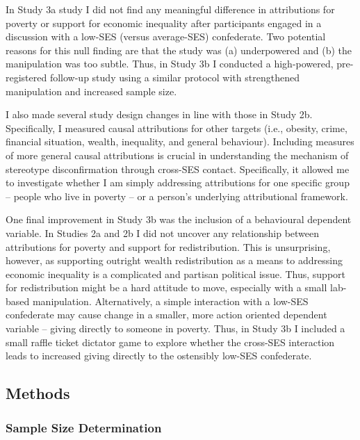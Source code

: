 \documentclass{sfuthesis}
\begin{document}
In Study 3a study I did not find any meaningful difference in attributions for poverty or support for economic inequality after participants engaged in a discussion with a low-SES (versus average-SES) confederate. Two potential reasons for this null finding are that the study was (a) underpowered and (b) the manipulation was too subtle. Thus, in Study 3b I conducted a high-powered, pre-registered follow-up study using a similar protocol with strengthened manipulation and increased sample size.

I also made several study design changes in line with those in Study 2b. Specifically, I measured causal attributions for other targets (i.e., obesity, crime, financial situation, wealth, inequality, and general behaviour). Including measures of more general causal attributions is crucial in understanding the mechanism of stereotype disconfirmation through cross-SES contact. Specifically, it allowed me to investigate whether I am simply addressing attributions for one specific group – people who live in poverty – or a person’s underlying attributional framework.

One final improvement in Study 3b was the inclusion of a behavioural dependent variable. In Studies 2a and 2b I did not uncover any relationship between attributions for poverty and support for redistribution. This is unsurprising, however, as supporting outright wealth redistribution as a means to addressing economic inequality is a complicated and partisan political issue. Thus, support for redistribution might be a hard attitude to move, especially with a small lab-based manipulation. Alternatively, a simple interaction with a low-SES confederate may cause change in a smaller, more action oriented dependent variable – giving directly to someone in poverty. Thus, in Study 3b I included a small raffle ticket dictator game to explore whether the cross-SES interaction leads to increased giving directly to the ostensibly low-SES confederate.

\subsection{Methods}
\subsubsection{Sample Size Determination}
\end{document}
